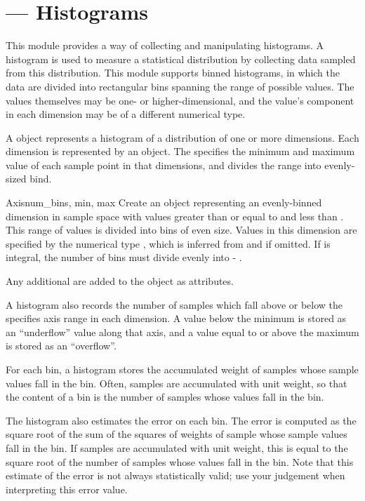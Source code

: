 \section{ --- Histograms}


This module provides a way of collecting and manipulating histograms.  A
histogram is used to measure a statistical distribution by collecting
data sampled from this distribution.  This module supports binned
histograms, in which the data are divided into rectangular bins spanning
the range of possible values.  The values themselves may be one- or
higher-dimensional, and the value's component in each dimension may be
of a different numerical type.

A  object represents a histogram of a distribution of
one or more dimensions.  Each dimension is represented by an
 object.  The  specifies the minimum and maximum
value of each sample point in that dimensions, and divides the range
into evenly-sized bind.

\begin{funcdesc}{Axis}{num_bins, min, max}
 Create an object representing an evenly-binned dimension in sample
 space with values greater than or equal to  and less than
 .  This range of values is divided into  bins of
 even size.  Values in this dimension are specified by the numerical
 type , which is inferred from  and  if
 omitted.  If  is integral, the number of bins must
 divide evenly into  - .

 Any additional  are added to the  object as
 attributes.
\end{funcdesc}

A histogram also records the number of samples which fall above or below
the specifies axis range in each dimension.  A value below the minimum
is stored as an ``underflow'' value along that axis, and a value equal
to or above the maximum is stored as an ``overflow''.

For each bin, a histogram stores the accumulated weight of samples whose
sample values fall in the bin.  Often, samples are accumulated with unit
weight, so that the content of a bin is the number of samples whose
values fall in the bin.  

The histogram also estimates the error on each bin.  The error is
computed as the square root of the sum of the squares of weights of
sample whose sample values fall in the bin.  If samples are accumulated
with unit weight, this is equal to the square root of the number of
samples whose values fall in the bin.  Note that this estimate of the
error is not always statistically valid; use your judgement when
interpreting this error value.

